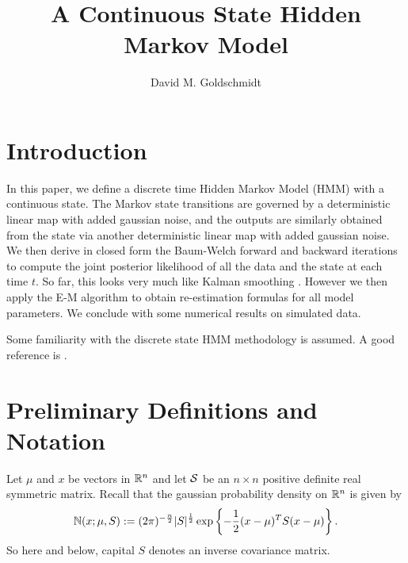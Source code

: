 \documentclass[12pt,leqno]{article}
\title{A Continuous State Hidden Markov Model}
\author{David M. Goldschmidt}
\begin{document}
\newcommand{\p}{\ensuremath{u}}
\newcommand{\VV}{V}
\maketitle


\section{Introduction}
In this paper, we define a discrete time Hidden Markov Model (HMM) with a continuous state.  The Markov state transitions
are governed by a deterministic linear map with added gaussian noise, and the outputs are similarly obtained from the
state via another deterministic linear map with added gaussian noise.  We then derive in closed form the Baum-Welch forward
and backward iterations \cite{Rabiner} to compute the joint posterior likelihood of all the data and the state at each
time $t$.  So far, this looks very much like Kalman smoothing \cite{}.  However we then apply the E-M algorithm \cite{}
to obtain re-estimation formulas for all model parameters.   We conclude with some numerical results on simulated data.

Some familiarity with the discrete state HMM methodology is assumed.  A good reference is \cite{bilmes}. 

\section{Preliminary Definitions and Notation}
Let $\mu$ and $x$ be vectors in $\R^n$ and let $\S$ be an $n\times{n}$ positive
definite real symmetric matrix.  Recall that the gaussian probability density
on $\R^n$ is given by 
$$
\N(x;\mu,S) := (2\pi)^{-\frac{n}{2}}|S|^{\frac{1}{2}}\exp\left\{-\frac{1}{2}
(x - \mu)^TS(x-\mu)\right\}.
$$
So here and below, capital $S$ denotes an inverse covariance matrix.
\end{document}

